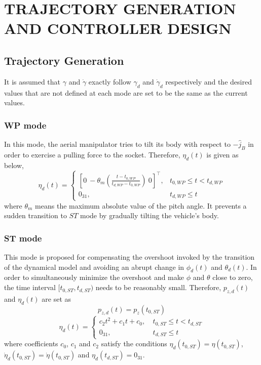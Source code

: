 \documentclass[letterpaper, 10 pt, conference]{ieeeconf}  %
\theoremstyle{definition}
\begin{document}
\section{TRAJECTORY GENERATION AND CONTROLLER DESIGN}
\subsection{Trajectory Generation}
It is assumed that $\gamma$ and $\dot{\gamma}$ exactly follow $\gamma_d$ and $\dot{\gamma}_d$ respectively and the desired values that are not defined at each mode are set to be the same as the current values.
\subsubsection{WP mode}
In this mode, the aerial manipulator tries to {tilt its body with respect to $-\hat{j}_B$} in order to exercise a pulling force to the socket. Therefore, $\eta_d(t)$ is given as below,
\begin{equation}\label{eq: trajectory (WP)}
    \eta_d(t) =
    \begin{cases}
        [0 \ -\theta_{m}(\frac{t-t_{0,WP}}{t_{d, WP} - t_{0, WP}}) \ 0 ]^{\top}, & t_{0, WP} \leq t < t_{d, WP} \\
        0_{31}, & t_{d, WP} \leq t
    \end{cases}
\end{equation}
where $\theta_m$ means the maximum absolute value of the pitch angle. It prevents a sudden transition to $ST$ mode by gradually {tilting the vehicle's body}.
\subsubsection{ST mode}
This mode is proposed for compensating the overshoot invoked by the transition of the dynamical model and avoiding an abrupt change in $\phi_d(t)$ and $\theta_d(t)$. In order to simultaneously minimize the overshoot and make $\phi$ and $\theta$ close to zero, the time interval $[t_{0, ST}, t_{d, ST})$ needs to be reasonably small. Therefore, $p_{z, d}(t)$ and $\eta_d(t)$ are set as
\begin{equation*}
    p_{z, d}(t) = p_z(t_{0,ST})
\end{equation*}
\begin{equation}\label{eq: trajectory (ST)}
    \eta_d(t) =
    \begin{cases}
    c_2 t^2 + c_1 t + c_0,\ &t_{0, ST} \leq t < t_{d, ST}\\
    0_{31},\ & t_{d, ST} \leq t
    \end{cases}
\end{equation}
where coefficients $c_0$, $c_1$ and $c_2$ satisfy the conditions $\eta_d(t_{0, ST}) = \eta(t_{0, ST})$, $\dot{\eta}_d(t_{0, ST}) = \dot{\eta}(t_{0, ST})$ and $\eta_d(t_{d, ST}) = 0_{31}$.
\end{document}
